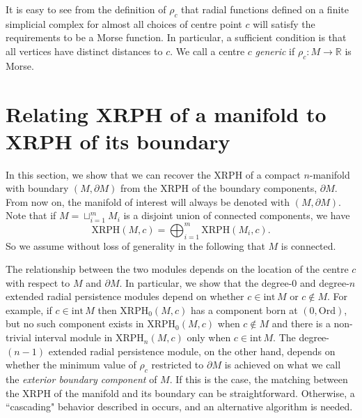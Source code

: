 \documentclass[a4paper,11pt]{article}
\theoremstyle{definition}
\newcommand{\R}{\mathbb{R}}
\begin{document}
It is easy to see from the definition of $\rho_c$ that radial functions defined on a finite simplicial complex for almost all choices of centre point $c$ will satisfy the requirements to be a Morse function. In particular, a sufficient condition is that all vertices have distinct distances to $c$. We call a centre $c$ \emph{generic} if $\rho_c: M\to \R$ is Morse.
\section[XRPH of manifolds with boundary]{Relating XRPH of a manifold to XRPH of its boundary}
\label{sec:proof}



In this section, we show that we can recover the XRPH of a compact $n$-manifold with boundary $(M,\partial M)$ from the XRPH of the boundary components, $\partial M$. From now on, the manifold of interest will always be denoted with $(M,\partial M)$. Note that if $M=\sqcup_{i=1}^m M_i$ is a disjoint union of connected components, we have $$\text{XRPH}(M,c)=\bigoplus_{i=1}^m\text{XRPH}(M_i,c).$$ 
So we assume without loss of generality in the following that $M$ is connected.

The relationship between the two modules depends on the location of the centre $c$ with respect to $M$ and $\partial M$. In particular, we show that the degree-0 and degree-$n$ extended radial persistence modules depend on whether $c\in \mathrm{int}\,M$ or $c\not\in M$. 
For example, if $c\in \mathrm{int}\, M$ then $\mathrm{XRPH_0}(M,c)$ has a component born at $(0,\mathrm{Ord})$, but no such component exists in $\mathrm{XRPH}_0(M,c)$ when $c\not\in M$ and 
there is a non-trivial interval module in $\mathrm{XRPH}_n(M,c)$ only when $c\in \mathrm{int}\, M$. 
The degree-$(n-1)$ extended radial persistence module, on the other hand, depends on whether the minimum value of $\rho_c$ restricted to $\partial M$ is achieved on what we call the \textit{exterior boundary component} of $M$. If this is the case, the matching between the XRPH of the manifold and its boundary can be straightforward. Otherwise, a ``cascading" behavior described in \cite{matching} occurs, and an alternative algorithm is needed. 
 
 
\end{document}

